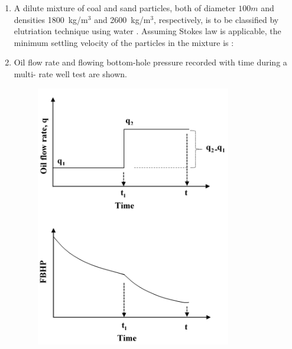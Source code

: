 \documentclass[journal,12pt,onecolumn]{IEEEtran}
\theoremstyle{remark}
\begin{document}
\begin{enumerate}
\begin{enumerate} 
\end{enumerate}

\item A dilute mixture of coal and sand particles, both of diameter $100m$ and densities 1800~kg/m$^3$ and 2600~kg/m$^3$, respectively, is to be classified by elutriation technique using water . Assuming Stokes law is applicable, the minimum settling velocity of the particles in the mixture is : 

\hfill{}

\begin{enumerate}
\end{enumerate}

\pagebreak

\item Oil flow rate and flowing bottom-hole pressure  recorded with time during a multi-
rate well test are shown.

\hfill{}

\begin{figure}[h!]
  \centering
  \includegraphics[width=0.4\columnwidth]{figs/pic10.png} 
\end{figure}


\end{enumerate}
\end{document}

